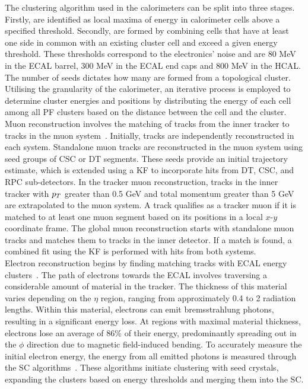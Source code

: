 The clustering algorithm used in the calorimeters can be split into three stages. 
Firstly,  are identified as local maxima of energy in calorimeter cells above a specified threshold. 
Secondly,  are formed by combining cells that have at least one side in common with an existing cluster cell and exceed a given energy threshold. 
These thresholds correspond to the electronics' noise and are 80 MeV in the \ac{ECAL} barrel, 300 MeV in the \ac{ECAL} end caps and 800 MeV in the \ac{HCAL}. 
The number of seeds dictates how many  are formed from a topological cluster.
Utilising the granularity of the calorimeter, an iterative process is employed to determine cluster energies and positions by distributing the energy of each cell among all \ac{PF} clusters based on the distance between the cell and the cluster. \\

Muon reconstruction involves the matching of tracks from the inner tracker to tracks in the muon system~\cite{CMS:2012nsv,CMS:2018rym}.
Initially, tracks are independently reconstructed in each system. 
Standalone muon tracks are reconstructed in the muon system using seed groups of \ac{CSC} or \ac{DT} segments. 
These seeds provide an initial trajectory estimate, which is extended using a \ac{KF} to incorporate hits from \ac{DT}, \ac{CSC}, and \ac{RPC} sub-detectors. 
In the tracker muon reconstruction, tracks in the inner tracker with $p_{T}$ greater than 0.5 GeV and total momentum greater than 5 GeV are extrapolated to the muon system. 
A track qualifies as a tracker muon if it is matched to at least one muon segment based on its positions in a local $x$-$y$ coordinate frame. 
The global muon reconstruction starts with standalone muon tracks and matches them to tracks in the inner detector. 
If a match is found, a combined fit using the \ac{KF} is performed with hits from both systems. \\

Electron reconstruction begins by finding matching tracks with \ac{ECAL} energy clusters~\cite{CMS:2015xaf}.
The path of electrons towards the \ac{ECAL} involves traversing a considerable amount of material in the tracker. 
The thickness of this material varies depending on the $\eta$ region, ranging from approximately 0.4 to 2 radiation lengths. 
Within this material, electrons can emit bremsstrahlung photons, resulting in a significant energy loss. 
At regions with maximal material thickness, electrons lose an average of 86\% of their energy, predominantly spreading out in the $\phi$ direction due to magnetic field-induced bending. 
To accurately measure the initial electron energy, the energy from all emitted photons is measured through the \ac{SC} algorithms~\cite{PF_CMS}. 
These algorithms initiate clustering with seed crystals, expanding the clusters based on energy thresholds and merging them into the \ac{SC}. \\

